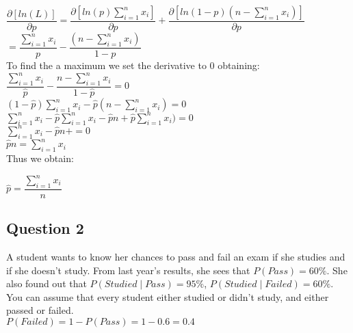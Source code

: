 \documentclass[12pt]{article}
\newcommand\tab[1][1cm]{\hspace*{#1}}
\begin{document}
    $\dfrac{\partial[ln(L) ]}{\partial p} = \dfrac{\partial[ ln(p) \sum^{n}_{i = 1} x_i  ]}{\partial p} + \dfrac{\partial[ ln( 1-p) (n - \sum^{n}_{i = 1} x_i)]}{\partial p} $ \\

    $ = \dfrac{\sum^{n}_{i = 1} x_i  }{p} - \dfrac{ (n - \sum^{n}_{i = 1} x_i) }{1 - p} $ \\

    To find the a maximum we set the derivative to 0 obtaining: \\

    $  \dfrac{\sum^{n}_{i = 1} x_i  }{\hat{p}} - \dfrac{ n - \sum^{n}_{i = 1} x_i }{1 - \hat{p}} = 0 $ \\

    $ (1-\hat{p})\sum^{n}_{i = 1} x_i - \hat{p} (n - \sum^{n}_{i = 1} x_i) = 0 $ \\

    $ \sum^{n}_{i = 1} x_i - \hat{p}\sum^{n}_{i = 1} x_i - \hat{p}n + \hat{p} \sum^{n}_{i = 1} x_i) = 0 $ \\

    $ \sum^{n}_{i = 1} x_i - \hat{p}n + = 0 $ \\

    $ \hat{p}n = \sum^{n}_{i = 1} x_i  $ \\

    Thus we obtain:

    \begin{center}
        $ \hat{p} = \dfrac{\sum^{n}_{i = 1} x_i}{n} $
    \end{center}



    \newpage
    \begin{center}
        \section*{Question 2}
    \end{center}

    \tab A student wants to know her chances to pass and fail an exam if she studies and if she doesn't study. From last year's results, she sees that $P(Pass) = 60\%$.
    She also found out that
    $P(Studied \mid Pass) = 95\%$,
    $P(Studied \mid Failed) = 60\%$.
    You can assume that every student either studied or didn't study, and either passed or failed.\\

    $P(Failed) = 1 - P(Pass) = 1 - 0.6 = 0.4 $ \\
\end{document}
